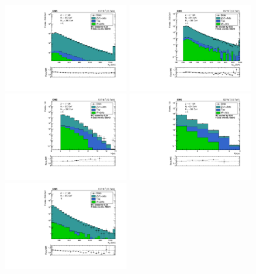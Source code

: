 \begin{figure}[htbp]
  \begin{center}
    \includegraphics[width=0.47\textwidth]{figs/zinv/crdybase_ht.pdf}
    \includegraphics[width=0.47\textwidth]{figs/zinv/crdybase_mt2.pdf} \\
    \includegraphics[width=0.47\textwidth]{figs/zinv/crdybase_nJet30.pdf}
    \includegraphics[width=0.47\textwidth]{figs/zinv/crdybase_nBJet20.pdf} \\
    \includegraphics[width=0.47\textwidth]{figs/zinv/crdybaseJ_ht.pdf}

\end{center}
\end{figure}
